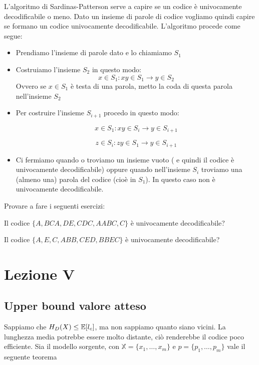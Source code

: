 \documentclass[12pt]{report}
\begin{document}
    L'algoritmo di Sardinas-Patterson serve a capire se un codice è univocamente decodificabile o meno.
    Dato un insieme di parole di codice vogliamo quindi capire se formano un codice univocamente decodificabile. L'algoritmo procede come segue:

    \begin{itemize}
        \item Prendiamo l'insieme di parole dato e lo chiamiamo $S_1$
        \item Costruiamo l'insieme $S_2$ in questo modo:
        $$x \in S_1 : xy \in S_1 \rightarrow y \in S_2$$
        Ovvero se $x \in S_1$ è testa di una parola, metto la coda di questa parola nell'insieme $S_2$
        \item Per costruire l'insieme $S_{i+1}$ procedo in questo modo:

        $$x \in S_1 : xy \in S_i \rightarrow y \in S_{i+1}$$

        $$z \in S_i : zy \in S_1 \rightarrow y \in S_{i+1}$$
        \item Ci fermiamo quando o troviamo un insieme vuoto ( e quindi il codice è univocamente decodificabile) oppure quando nell'insieme $S_i$ troviamo una (almeno una) parola del codice (cioè in $S_1$). In questo caso non è univocamente decodificabile.
    \end{itemize}
    Provare a fare i seguenti esercizi:

    \begin{es}
        Il codice $\{A,BCA,DE,CDC,AABC,C\}$ è univocamente decodificabile?
    \end{es}

    \begin{es}
        Il codice $\{A,E,C,ABB,CED,BBEC\}$ è univocamente decodificabile?
    \end{es}

    \chapter{Lezione V}
    \label{cap:Lezione V}
    \section{Upper bound valore atteso}

    Sappiamo che $H_D(X) \leq \mathbb{E} [l_c]$, ma non sappiamo quanto siano vicini. La lunghezza media potrebbe essere molto distante, ciò renderebbe il codice poco efficiente.
    Sia \modello il modello sorgente, con $\mathbb{X} = \{x_1,\dots,x_m\}$ e $p = \{p_1,\dots,p_m\}$ vale il seguente teorema
\end{document}
